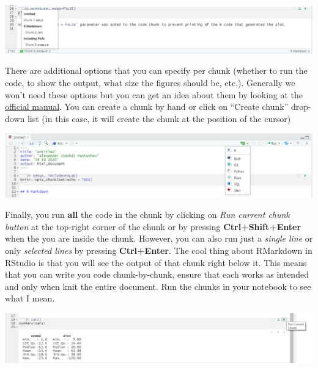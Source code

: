 \documentclass[
]{book}
\begin{document}
\begin{center}\includegraphics[width=1\linewidth]{images/notebook-navigation} \end{center}

There are additional options that you can specify per chunk (whether to run the code, to show the output, what size the figures should be, etc.). Generally we won't need these options but you can get an idea about them by looking at the \href{https://yihui.org/knitr/options/}{official manual}. You can create a chunk by hand or click on ``Create chunk'' drop-down list (in this case, it will create the chunk at the position of the cursor)

\begin{center}\includegraphics[width=1\linewidth]{images/notebook-insert-chunk} \end{center}

Finally, you run \textbf{all} the code in the chunk by clicking on \emph{Run current chunk button} at the top-right corner of the chunk or by pressing \textbf{Ctrl+Shift+Enter} when the you are inside the chunk. However, you can also run just a \emph{single line} or only \emph{selected lines} by pressing \textbf{Ctrl+Enter}. The cool thing about RMarkdown in RStudio is that you will see the output of that chunk right below it. This means that you can write you code chunk-by-chunk, ensure that each works as intended and only when knit the entire document. Run the chunks in your notebook to see what I mean.

\begin{center}\includegraphics[width=1\linewidth]{images/notebook-run-chunk} \end{center}
\end{document}
